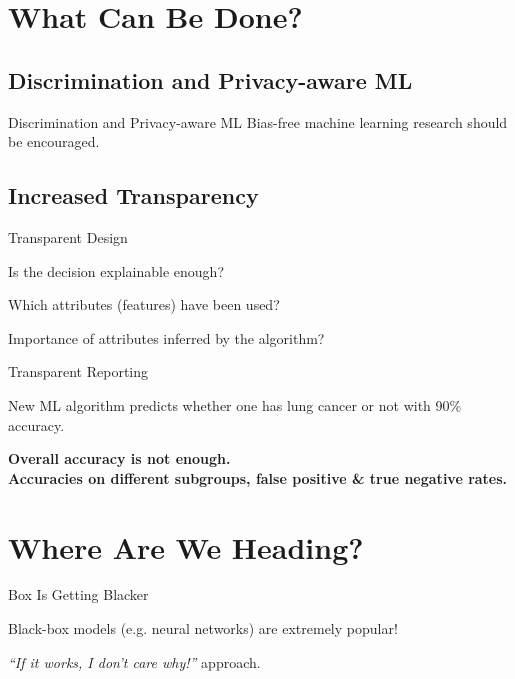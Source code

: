 \documentclass{beamer}
\begin{document}
\section{What Can Be Done?}

\subsection{Discrimination and Privacy-aware ML}
\begin{frame}{Discrimination and Privacy-aware ML}
Bias-free machine learning research should be encouraged.
\end{frame}

\subsection{Increased Transparency}
\begin{frame}{Transparent Design}
\begin{block}{ }
Is the decision explainable enough?
\end{block} \pause
\begin{block}{ }
Which attributes (features) have been used?
\end{block} \pause
\begin{block}{ }
Importance of attributes inferred by the algorithm?
\end{block}
\end{frame}

\begin{frame}{Transparent Reporting}
\begin{block}{ }
New ML algorithm predicts whether one has lung cancer or not with 90\% accuracy.
\end{block} \pause
\vspace{0.2cm}
\textbf{Overall accuracy is not enough. \\ \pause
\vspace{0.2cm}
Accuracies on different subgroups, false positive \& true negative rates.}
\end{frame}

\section{Where Are We Heading?}
\begin{frame}{Box Is Getting Blacker}
\begin{block}{ }
Black-box models (e.g. neural networks) are extremely popular!
\end{block}
\begin{block}{ }
\textit{``If it works, I don't care why!''} approach.
\end{block}
\end{frame}
\end{document}
